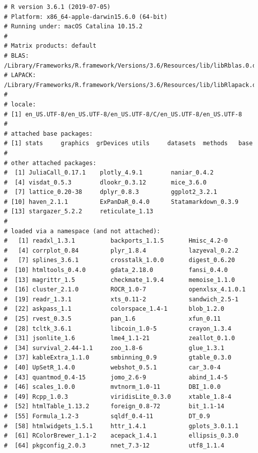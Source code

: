 \documentclass[
  12pt,
]{article}
\begin{document}
\begin{verbatim}
# R version 3.6.1 (2019-07-05) 
# Platform: x86_64-apple-darwin15.6.0 (64-bit) 
# Running under: macOS Catalina 10.15.2 
#  
# Matrix products: default 
# BLAS:   /Library/Frameworks/R.framework/Versions/3.6/Resources/lib/libRblas.0.dylib 
# LAPACK: /Library/Frameworks/R.framework/Versions/3.6/Resources/lib/libRlapack.dylib 
#  
# locale: 
# [1] en_US.UTF-8/en_US.UTF-8/en_US.UTF-8/C/en_US.UTF-8/en_US.UTF-8 
#  
# attached base packages: 
# [1] stats     graphics  grDevices utils     datasets  methods   base      
#  
# other attached packages: 
#  [1] JuliaCall_0.17.1    plotly_4.9.1        naniar_0.4.2        
#  [4] visdat_0.5.3        dlookr_0.3.12       mice_3.6.0          
#  [7] lattice_0.20-38     dplyr_0.8.3         ggplot2_3.2.1       
# [10] haven_2.1.1         ExPanDaR_0.4.0      Statamarkdown_0.3.9 
# [13] stargazer_5.2.2     reticulate_1.13     
#  
# loaded via a namespace (and not attached): 
#   [1] readxl_1.3.1          backports_1.1.5       Hmisc_4.2-0           
#   [4] corrplot_0.84         plyr_1.8.4            lazyeval_0.2.2        
#   [7] splines_3.6.1         crosstalk_1.0.0       digest_0.6.20         
#  [10] htmltools_0.4.0       gdata_2.18.0          fansi_0.4.0           
#  [13] magrittr_1.5          checkmate_1.9.4       memoise_1.1.0         
#  [16] cluster_2.1.0         ROCR_1.0-7            openxlsx_4.1.0.1      
#  [19] readr_1.3.1           xts_0.11-2            sandwich_2.5-1        
#  [22] askpass_1.1           colorspace_1.4-1      blob_1.2.0            
#  [25] rvest_0.3.5           pan_1.6               xfun_0.11             
#  [28] tcltk_3.6.1           libcoin_1.0-5         crayon_1.3.4          
#  [31] jsonlite_1.6          lme4_1.1-21           zeallot_0.1.0         
#  [34] survival_2.44-1.1     zoo_1.8-6             glue_1.3.1            
#  [37] kableExtra_1.1.0      smbinning_0.9         gtable_0.3.0          
#  [40] UpSetR_1.4.0          webshot_0.5.1         car_3.0-4             
#  [43] quantmod_0.4-15       jomo_2.6-9            abind_1.4-5           
#  [46] scales_1.0.0          mvtnorm_1.0-11        DBI_1.0.0             
#  [49] Rcpp_1.0.3            viridisLite_0.3.0     xtable_1.8-4          
#  [52] htmlTable_1.13.2      foreign_0.8-72        bit_1.1-14            
#  [55] Formula_1.2-3         sqldf_0.4-11          DT_0.9                
#  [58] htmlwidgets_1.5.1     httr_1.4.1            gplots_3.0.1.1        
#  [61] RColorBrewer_1.1-2    acepack_1.4.1         ellipsis_0.3.0        
#  [64] pkgconfig_2.0.3       nnet_7.3-12           utf8_1.1.4            

\end{verbatim}
\end{document}
